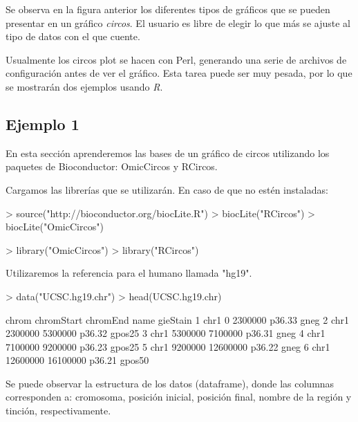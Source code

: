 \documentclass[a4paper,spanish]{article}
\begin{document}
Se observa en la figura anterior los diferentes tipos de gráficos que se pueden presentar en un gráfico \textit{circos}. El usuario es libre de elegir lo que más se ajuste al tipo de datos con el que cuente.

Usualmente los circos plot se hacen con Perl, generando una serie de archivos de configuración antes de ver el gráfico. Esta tarea puede ser muy pesada, por lo que se mostrarán dos ejemplos usando \textit{R}.

\subsection{Ejemplo 1}
\label{ejemplo1}

En esta sección aprenderemos las bases de un gráfico de circos utilizando los paquetes de Bioconductor: OmicCircos y RCircos.

Cargamos las librerías que se utilizarán. En caso de que no estén instaladas:

\begin{Schunk}
\begin{Sinput}
> source("http://bioconductor.org/biocLite.R")
> biocLite("RCircos")
> biocLite("OmicCircos")
\end{Sinput}
\end{Schunk}

\begin{Schunk}
\begin{Sinput}
> library("OmicCircos")
> library("RCircos")
\end{Sinput}
\end{Schunk}

Utilizaremos la referencia para el humano llamada "hg19".

\begin{Schunk}
\begin{Sinput}
> data("UCSC.hg19.chr")
> head(UCSC.hg19.chr)
\end{Sinput}
\begin{Soutput}
  chrom chromStart chromEnd   name gieStain
1  chr1          0  2300000 p36.33     gneg
2  chr1    2300000  5300000 p36.32   gpos25
3  chr1    5300000  7100000 p36.31     gneg
4  chr1    7100000  9200000 p36.23   gpos25
5  chr1    9200000 12600000 p36.22     gneg
6  chr1   12600000 16100000 p36.21   gpos50
\end{Soutput}
\end{Schunk}

Se puede observar la estructura de los datos (dataframe), donde las columnas corresponden a: cromosoma, posición inicial, posición final, nombre de la región y tinción, respectivamente. 
\end{document}
